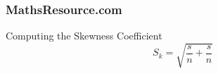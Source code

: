 

\begin{frame}
\frametitle{MathsResource.com}
\Large


Computing the Skewness Coefficient
{
\LARGE
\[S_k = \sqrt{ \frac{s}{n} + \frac{s}{n} }  \] 
}


\end{frame}
